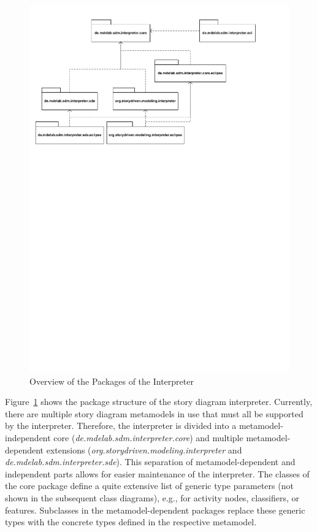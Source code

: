 \begin{figure}[htbp]
  \centering
  \includegraphics[width=1.0\columnwidth]{./figures/interpreter_packages.pdf}
  \caption{Overview of the Packages of the Interpreter}
  \label{fig:interpreter_packages}
\end{figure}

Figure~\ref{fig:interpreter_packages} shows the package structure of the story diagram interpreter.
Currently, there are multiple story diagram metamodels in use that must all be supported by the interpreter. 
Therefore, the interpreter is divided into a metamodel-independent core (\emph{de.mdelab.sdm.interpreter.core}) and multiple metamodel-dependent extensions (\emph{org.storydriven.modeling.interpreter} and \emph{de.mdelab.sdm.interpreter.sde}). 
This separation of metamodel-dependent and independent parts allows for easier maintenance of the interpreter. 
The classes of the core package define a quite extensive list of generic type parameters (not shown in the subsequent class diagrams), e.g., for activity nodes, classifiers, or features. 
Subclasses in the metamodel-dependent packages replace these generic types with the concrete types defined in the respective metamodel.

